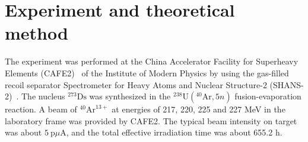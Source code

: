 \documentclass[final,5p,times,twocolumn,number,sort&compress]{elsarticle}
\begin{document}

\section{Experiment and theoretical method}

The experiment was performed at the China Accelerator Facility for Superheavy Elements (CAFE2)~\cite{sheng2021IonopticalDesignMultiparticle} of the Institute of Modern Physics by using the gas-filled recoil separator Spectrometer for Heavy Atoms and Nuclear Structure-2 (SHANS-2)~\cite{xu2023GasfilledRecoilSeparator}. The nucleus $^{273}\text{Ds}$ was synthesized in the $^{238}\text{U}(^{40}\text{Ar}, 5n)$ fusion-evaporation reaction. A beam of $^{40}\text{Ar}^{13+}$ at energies of 217, 220, 225 and 227 MeV in the laboratory frame was provided by CAFE2. The typical beam intensity on target was about $5\ \mathrm{p}\mu\mathrm{A}$, and the total effective irradiation time was about 655.2 h.
\end{document}
